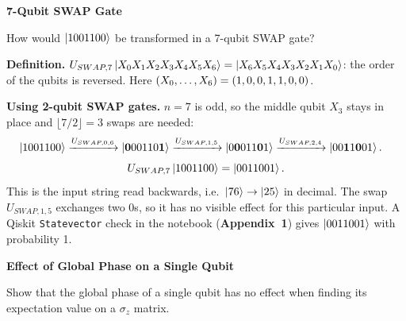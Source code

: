 \documentclass[a4paper, 10pt]{article}
\begin{document}
\begin{problem}
\textbf{7-Qubit SWAP Gate}
\par How would \( \ket{1001100} \) be transformed in a 7-qubit SWAP gate?
\end{problem}

\begin{solution}
	\noindent \textbf{Definition.} \( U_{SWAP, 7}\ket{X_0X_1X_2X_3X_4X_5X_6} = \ket{X_6X_5X_4X_3X_2X_1X_0} \): the order of the qubits is reversed.
	Here \( \left(X_0, \dots, X_6\right) = \left(1, 0, 0, 1, 1, 0, 0\right) \).

	\myspace

	\noindent \textbf{Using 2-qubit SWAP gates.} \( n = 7 \) is odd, so the middle qubit \( X_3 \) stays in place and \( \lfloor 7/2 \rfloor = 3 \) swaps are needed:
	\begin{align*}
		\ket{1001100} & \xrightarrow{U_{SWAP, 0, 6}} \ket{\mathbf{0}00110\mathbf{1}}
		\xrightarrow{U_{SWAP, 1, 5}} \ket{0\mathbf{0}011\mathbf{0}1}
		\xrightarrow{U_{SWAP, 2, 4}} \ket{00\mathbf{1}1\mathbf{0}01}.
	\end{align*}
	\[
		U_{SWAP, 7}\ket{1001100} = \ket{0011001}.
	\]
	This is the input string read backwards, i.e.\ \( \ket{76} \to \ket{25} \) in decimal. The swap \( U_{SWAP, 1, 5} \) exchanges two \( 0 \)s, so it has no visible effect for this particular input. A Qiskit \texttt{Statevector} check in the notebook (\textbf{Appendix~1}) gives \( \ket{0011001} \) with probability 1.
\end{solution}

\begin{problem}
\textbf{Effect of Global Phase on a Single Qubit}
\par Show that the global phase of a single qubit has no effect when finding its expectation value on a \( \sigma_z \) matrix.
\end{problem}
\end{document}
